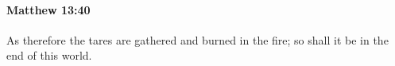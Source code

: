 			\begin{framed}
			\scriptsize
				\begin{compactdesc}
					\item[SBLG]  \hyperref[SUNTELEIA]{} \hyperref[AION]{} 
				\end{compactdesc}
			\end{framed}

		\paragraph{Matthew 13:40} %
			\label{MATTHEW-13-40}

			As therefore the tares are gathered and burned in the fire; so shall it be in the end of this world.

			\begin{framed}
			\scriptsize
				\begin{compactdesc}
					\item[SBLG]  \hyperref[AION]{\grl{αἰῶνος}}\gr{·}
				\end{compactdesc}
			\end{framed}

